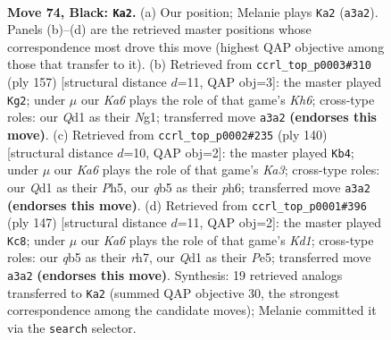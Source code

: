 \documentclass[11pt]{article}
\begin{document}
\clearpage

\begin{figure}[p]\centering
\begin{subfigure}{0.46\textwidth}\centering
\resizebox{\linewidth}{!}{%
\newchessgame
\chessboard[
  setfen={7K/8/6N1/1Q6/8/k7/8/3q4 b - - 18 74},
  showmover=false,
  pgfstyle=straightmove, color=movearrow, markmove={a3-a2}
]}
\caption{}
\end{subfigure}\hfill
\begin{subfigure}{0.46\textwidth}\centering
\resizebox{\linewidth}{!}{%
\newchessgame
\chessboard[
  setfen={2Q5/8/8/8/8/7k/1K6/3N2n1 b - - 0 79},
  showmover=false,
  pgfstyle=straightmove, color=movearrow, markmove={h3-g2}
]}
\caption{}
\end{subfigure}
\\[4pt]
\begin{subfigure}{0.46\textwidth}\centering
\resizebox{\linewidth}{!}{%
\newchessgame
\chessboard[
  setfen={5k2/8/4n2p/7P/8/K7/2B5/8 w - - 17 71},
  showmover=false,
  pgfstyle=straightmove, color=movearrow, markmove={a3-b4}
]}
\caption{}
\end{subfigure}\hfill
\begin{subfigure}{0.46\textwidth}\centering
\resizebox{\linewidth}{!}{%
\newchessgame
\chessboard[
  setfen={3k4/7R/8/4p1K1/4N3/8/8/5r2 b - - 6 74},
  showmover=false,
  pgfstyle=straightmove, color=movearrow, markmove={d8-c8}
]}
\caption{}
\end{subfigure}
\caption{\textbf{Move 74, Black: \texttt{Ka2}.} (a) Our position; Melanie plays \texttt{Ka2} (\texttt{a3a2}). Panels (b)--(d) are the retrieved master positions whose correspondence most drove this move (highest QAP objective among those that transfer to it). (b) Retrieved from \texttt{ccrl\_top\_p0003\#310} (ply 157) [structural distance $d$=11, QAP obj=3]: the master played \texttt{Kg2}; under $\mu$ our \emph{Ka6} plays the role of that game's \emph{Kh6}; cross-type roles: our \emph{Q}d1 as their \emph{N}g1; transferred move \texttt{a3a2} \textbf{(endorses this move)}. (c) Retrieved from \texttt{ccrl\_top\_p0002\#235} (ply 140) [structural distance $d$=10, QAP obj=2]: the master played \texttt{Kb4}; under $\mu$ our \emph{Ka6} plays the role of that game's \emph{Ka3}; cross-type roles: our \emph{Q}d1 as their \emph{P}h5, our \emph{q}b5 as their \emph{p}h6; transferred move \texttt{a3a2} \textbf{(endorses this move)}. (d) Retrieved from \texttt{ccrl\_top\_p0001\#396} (ply 147) [structural distance $d$=11, QAP obj=2]: the master played \texttt{Kc8}; under $\mu$ our \emph{Ka6} plays the role of that game's \emph{Kd1}; cross-type roles: our \emph{q}b5 as their \emph{r}h7, our \emph{Q}d1 as their \emph{P}e5; transferred move \texttt{a3a2} \textbf{(endorses this move)}. Synthesis: 19 retrieved analogs transferred to \texttt{Ka2} (summed QAP objective 30, the strongest correspondence among the candidate moves); Melanie committed it via the \texttt{search} selector.}
\label{fig:thought-m147}
\end{figure}
\end{document}
